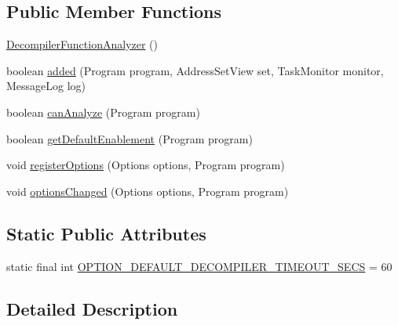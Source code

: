 \subsection*{Public Member Functions}
\begin{DoxyCompactItemize}
\item 
\mbox{\hyperlink{classghidra_1_1app_1_1plugin_1_1core_1_1analysis_1_1_decompiler_function_analyzer_a43e998265f4d4e275532188de3b6a425}{Decompiler\+Function\+Analyzer}} ()
\item 
boolean \mbox{\hyperlink{classghidra_1_1app_1_1plugin_1_1core_1_1analysis_1_1_decompiler_function_analyzer_a8b7be13bc0b90560b10fa9d76472746b}{added}} (Program program, Address\+Set\+View set, Task\+Monitor monitor, Message\+Log log)
\item 
boolean \mbox{\hyperlink{classghidra_1_1app_1_1plugin_1_1core_1_1analysis_1_1_decompiler_function_analyzer_a126548adad0c4cb3ec47954ebb39cb16}{can\+Analyze}} (Program program)
\item 
boolean \mbox{\hyperlink{classghidra_1_1app_1_1plugin_1_1core_1_1analysis_1_1_decompiler_function_analyzer_a51d7152dc2485350a4b16051aef8aeff}{get\+Default\+Enablement}} (Program program)
\item 
void \mbox{\hyperlink{classghidra_1_1app_1_1plugin_1_1core_1_1analysis_1_1_decompiler_function_analyzer_a557e09b6f9d742231481f66fe208b56c}{register\+Options}} (Options options, Program program)
\item 
void \mbox{\hyperlink{classghidra_1_1app_1_1plugin_1_1core_1_1analysis_1_1_decompiler_function_analyzer_a6841ab310a9e76f3c25c3bc78d5879bf}{options\+Changed}} (Options options, Program program)
\end{DoxyCompactItemize}
\subsection*{Static Public Attributes}
\begin{DoxyCompactItemize}
\item 
static final int \mbox{\hyperlink{classghidra_1_1app_1_1plugin_1_1core_1_1analysis_1_1_decompiler_function_analyzer_a1bd55b2cc478663c42904f3b755a9e0c}{O\+P\+T\+I\+O\+N\+\_\+\+D\+E\+F\+A\+U\+L\+T\+\_\+\+D\+E\+C\+O\+M\+P\+I\+L\+E\+R\+\_\+\+T\+I\+M\+E\+O\+U\+T\+\_\+\+S\+E\+CS}} = 60
\end{DoxyCompactItemize}


\subsection{Detailed Description}


